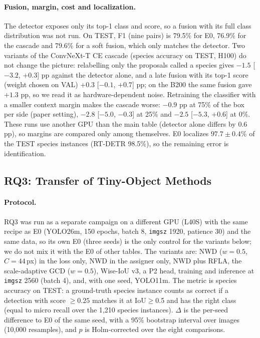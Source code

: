\paragraph{Fusion, margin, cost and localization.} The detector exposes only its top-1 class and score, so a fusion with its full class distribution was not run. On TEST, F1 (nine pairs) is 79.5\% for E0, 76.9\% for the cascade and 79.6\% for a soft fusion, which only matches the detector. Two variants of the ConvNeXt-T CE cascade (species accuracy on TEST, H100) do not change the picture: relabelling only the proposals called a species gives $-1.5$ [$-3.2$, $+0.3$] pp against the detector alone, and a late fusion with its top-1 score (weight chosen on VAL) $+0.3$ [$-0.1$, $+0.7$] pp; on the B200 the same fusion gave $+1.3$ pp, so we read it as hardware-dependent noise. Retraining the classifier with a smaller context margin makes the cascade worse: $-0.9$ pp at 75\% of the box per side (paper setting), $-2.8$ [$-5.0$, $-0.3$] at 25\% and $-2.5$ [$-5.3$, $+0.6$] at 0\%. These runs use another GPU than the main table (detector alone differs by 0.6 pp), so margins are compared only among themselves. E0 localizes $97.7\pm0.4$\% of the TEST species instances (RT-DETR 98.5\%), so the remaining error is identification.

\subsection{RQ3: Transfer of Tiny-Object Methods}
\label{sec:exp:rq3}

\paragraph{Protocol.}
RQ3 was run as a separate campaign on a different GPU (L40S) with the same recipe as E0 (YOLO26m, 150 epochs, batch 8, \texttt{imgsz} 1920, patience 30) and the same data, so its own E0 (three seeds) is the only control for the variants below; we do not mix it with the E0 of other tables. The variants are: NWD ($w{=}0.5$, $C{=}44$\,px) in the loss only, NWD in the assigner only, NWD plus RFLA, the scale-adaptive GCD ($w{=}0.5$), Wise-IoU v3, a P2 head, training and inference at \texttt{imgsz} 2560 (batch 4), and, with one seed, YOLO11m. The metric is species accuracy on TEST: a ground-truth species instance counts as correct if a detection with score $\ge0.25$ matches it at IoU$\ge$0.5 and has the right class (equal to micro recall over the 1{,}210 species instances). $\Delta$ is the per-seed difference to E0 of the same seed, with a 95\% bootstrap interval over images (10{,}000 resamples), and $p$ is Holm-corrected over the eight comparisons.

